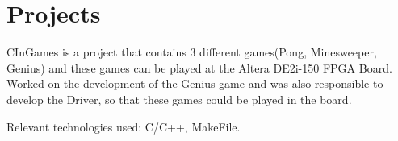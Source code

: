 \documentclass[]{deedy-resume-openfont}
\begin{document}
\begin{minipage}[t]{0.66\textwidth}






\section{Projects}

\begin{tightemize}
\item {CInGames is a project that contains 3 different games(Pong, Minesweeper, Genius) and these games can be played at the Altera DE2i-150 FPGA Board. Worked on the development of the Genius game and was also responsible to develop the Driver, so that these games could be played in the board. }
\item {Relevant technologies used: C/C++, MakeFile.}
\end{tightemize}


\end{minipage}
\end{document}
